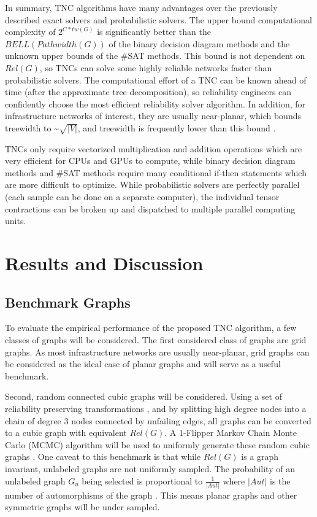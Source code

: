 \documentclass[12pt,twocolumn]{article}
\begin{document}
In summary, TNC algorithms have many advantages over the previously described exact solvers and probabilistic solvers. The upper bound computational complexity of \(2^{C*tw(G)}\) is significantly better than the \(BELL(Pathwidth(G))\) of the binary decision diagram methods and the unknown upper bounds of the \#SAT methods. This bound is not dependent on \(Rel(G)\), so TNCs can solve some highly reliable networks faster than probabilistic solvers. The computational effort of a TNC can be known ahead of time (after the approximate tree decomposition), so reliability engineers can confidently choose the most efficient reliability solver algorithm. In addition, for infrastructure networks of interest, they are usually near-planar, which bounds treewidth to \textasciitilde{}\(\sqrt{|V|}\), and treewidth is frequently lower than this bound \cite{maniu2019experimental}.

TNCs only require vectorized multiplication and addition operations which are very efficient for CPUs and GPUs to compute, while binary decision diagram methods and \#SAT methods require many conditional if-then statements which are more difficult to optimize. While probabilistic solvers are perfectly parallel (each sample can be done on a separate computer), the individual tensor contractions can be broken up and dispatched to multiple parallel computing units.

\hypertarget{results-and-discussion}{%
\section{Results and Discussion}\label{results-and-discussion}}

\hypertarget{benchmark-graphs}{%
\subsection{Benchmark Graphs}\label{benchmark-graphs}}

To evaluate the empirical performance of the proposed TNC algorithm, a few classes of graphs will be considered. The first considered class of graphs are grid graphs. As most infrastructure networks are usually near-planar, grid graphs can be considered as the ideal case of planar graphs and will serve as a useful benchmark.

Second, random connected cubic graphs will be considered. Using a set of reliability preserving transformations \cite{shooman1991exact}, and by splitting high degree nodes into a chain of degree 3 nodes connected by unfailing edges, all graphs can be converted to a cubic graph with equivalent \(Rel(G)\). A 1-Flipper Markov Chain Monte Carlo (MCMC) algorithm will be used to uniformly generate these random cubic graphs \cite{feder2006local}. One caveat to this benchmark is that while \(Rel(G)\) is a graph invariant, unlabeled graphs are not uniformly sampled. The probability of an unlabeled graph \(G_u\) being selected is proportional to \(\frac{1}{|Aut|}\) where \(|Aut|\) is the number of automorphisms of the graph \cite{fosdick2018configuring}. This means planar graphs \cite{mcdiarmid2005random} and other symmetric graphs will be under sampled.
\end{document}

